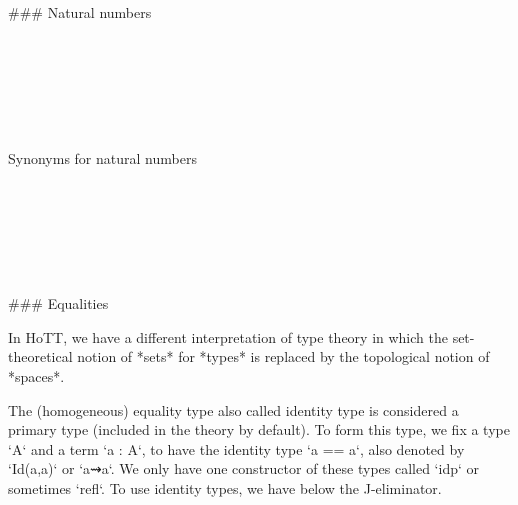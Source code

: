 ### Natural numbers

\begin{code}%
\>[0]\<%
\\
\>[0][@{}l@{\AgdaIndent{0}}]%
\>[2]\<%
\\
\>[2][@{}l@{\AgdaIndent{0}}]%
\>[4]\AgdaSymbol{:}\AgdaSpace{}%
\<%
\\
%
\>[2]\<%
\\
%
\>[2]\AgdaSpace{}%
\AgdaSymbol{:}\AgdaSpace{}%
\<%
\\
%
\>[2]\AgdaSpace{}%
\AgdaSymbol{:}\AgdaSpace{}%
\AgdaSpace{}%
\AgdaSpace{}%
\<%
\end{code}

Synonyms for natural numbers

\begin{code}%
\>[0]\AgdaSpace{}%
\AgdaSymbol{=}\AgdaSpace{}%
\<%
\\
%
\\[\AgdaEmptyExtraSkip]%
\>[0]\AgdaSpace{}%
%
\>[11]\AgdaSymbol{=}\AgdaSpace{}%
\<%
\\
\>[0]\AgdaSpace{}%
\AgdaSpace{}%
\AgdaSymbol{=}\AgdaSpace{}%
\<%
\\
%
\\[\AgdaEmptyExtraSkip]%
\>[0]\AgdaSymbol{\{-\#}\AgdaSpace{}%
\AgdaSpace{}%
\AgdaSpace{}%
\AgdaSpace{}%
\AgdaSymbol{\#-\}}\<%
\end{code}

### Equalities

In HoTT, we have a different interpretation of type theory in which the
set-theoretical notion of *sets* for *types* is replaced by the topological
notion of *spaces*.

The (homogeneous) equality type also called identity type is considered a primary type
(included in the theory by default). To form this type, we fix a type `A` and a
term `a : A`, to have the identity type `a == a`, also denoted by `Id(a,a)` or
`a⇝a`. We only have one constructor of these types called `idp` or sometimes
`refl`. To use identity types, we have below the J-eliminator.

